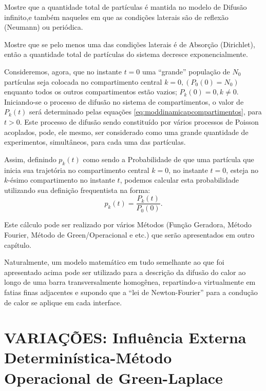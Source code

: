 
    \begin{exercise}
    Mostre que a quantidade total de partículas é mantida no modelo de Difusão infinito,e também naqueles em que as condições laterais são de reflexão (Neumann) ou periódica. 
    \end{exercise}

    \begin{exercise}
    Mostre que se pelo menos uma das condições laterais é de Absorção (Dirichlet), então a quantidade total de partículas do sistema decresce exponencialmente. 
    \end{exercise}

    Consideremos, agora, que no instante \(t = 0\) uma ``grande'' população de \(N_0\) partículas seja colocada no compartimento central \(k = 0, (P_0(0) = N_0)\) enquanto todos os outros compartimentos estão vazios; \(P_k(0) = 0, k \ne 0\). Iniciando-se o processo de difusão no sistema de compartimentos, o valor de \(P_k(t)\) será determinado pelas equações \eqref{eq:moddinamicapcompartimentos}, para \(t > 0\). Este processo de difusão sendo constituído por vários processos de Poisson acoplados, pode, ele mesmo, ser considerado como uma grande quantidade de experimentos, simultâneos, para cada uma das partículas.

    Assim, definindo \(p_k(t)\) como sendo a Probabilidade de que uma partícula que inicia sua trajetória no compartimento central \(k = 0\), no instante \(t = 0\), esteja no \(k\)-ésimo compartimento no instante \(t\), podemos calcular esta probabilidade utilizando sua definição frequentista na forma:
    \[p_k(t) = \dfrac{P_k(t)}{P_0(0)}.\]

    Este cálculo pode ser realizado por vários Métodos (Função Geradora, Método Fourier, Método de Green/Operacional e etc.) que serão apresentados em outro capítulo.

    Naturalmente, um modelo matemático em tudo semelhante ao que foi apresentado acima pode ser utilizado para a descrição da difusão do calor ao longo de uma barra transversalmente homogênea, repartindo-a virtualmente em fatias finas adjacentes e supondo que a ``lei de Newton-Fourier'' para a condução de calor se aplique em cada interface. 

\section{VARIAÇÕES: Influência Externa Determinística-Método Operacional de Green-Laplace}


